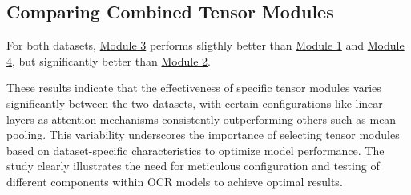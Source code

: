 \subsection{Comparing Combined Tensor Modules}
\label{subsec:5_comparing_combined_tensor_modules}
For both datasets, \hyperref[subpar:3_linear_layers_as_attention_net]{Module 3} performs sligthly better than \hyperref[subpar:3_adding]{Module 1} and \hyperref[subpar:3_convolutional_layers_as_attention_net]{Module 4}, but significantly better than \hyperref[subpar:3_mean_pooling]{Module 2}. 

These results indicate that the effectiveness of specific tensor modules varies significantly between the two datasets, with certain configurations like linear layers as attention mechanisms consistently outperforming others such as mean pooling. This variability underscores the importance of selecting tensor modules based on dataset-specific characteristics to optimize model performance. The study clearly illustrates the need for meticulous configuration and testing of different components within OCR models to achieve optimal results.


